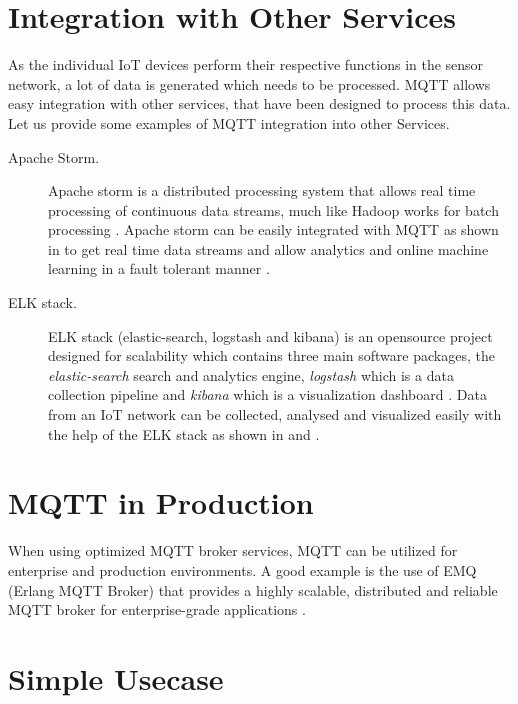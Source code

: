 \section{Integration with Other Services}

As the individual IoT devices perform their respective functions in
the sensor network, a lot of data is generated which needs to be
processed. MQTT allows easy integration with other services, that have
been designed to process this data. Let us provide some examples of
MQTT integration into other Services.

\begin{description}

\item[Apache Storm.] Apache storm is a distributed processing system
  that allows real time processing of continuous data streams, much
  like Hadoop works for batch processing \cite{apache-storm}. Apache
  storm can be easily integrated with MQTT as shown in
  \cite{apache-storm-mqtt} to get real time data streams and allow
  analytics and online machine learning in a fault tolerant manner
  \cite{apache-storm-wiki}.

\item [ELK stack.]  ELK stack (elastic-search, logstash and kibana) is
  an opensource project designed for scalability which contains three
  main software packages, the \textit{elastic-search} search and
  analytics engine, \textit{logstash} which is a data collection pipeline
  and \textit{kibana} which is a visualization dashboard
  \cite{elk-stack}. Data from an IoT network can be collected,
  analysed and visualized easily with the help of the ELK stack as
  shown in \cite{mqtt-elasticsearch-setup} and
  \cite{kibana-mqtt-analysis}.


\end{description}

\section{MQTT in Production}

When using optimized MQTT broker services, MQTT can be utilized for
enterprise and production environments. A good example is the use of
EMQ (Erlang MQTT Broker) that provides a highly scalable, distributed
and reliable MQTT broker for enterprise-grade applications
\cite{erlang-mqtt-broker}.


\section{Simple Usecase}

